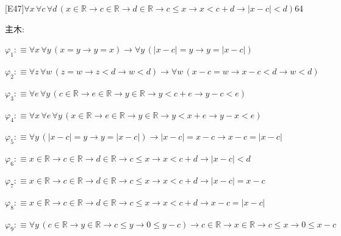 \begin{fullproof}{[E47]}{$\forall x\,\forall c\,\forall d\,(x \in \mathbb{R} \to c \in \mathbb{R} \to d \in \mathbb{R} \to c \leq x \to x < c + d \to \lvert x - c \rvert < d)$}{64}
\begin{ptree}
\end{ptree}
\noindent 主木:
\begin{ptree}
\noLine
{}
\noLine
{}
\end{ptree}
\begin{abbrevlist}
\item $\varphi_{1} :\equiv \forall x\,\forall y\,(x = y \to y = x) \to \forall y\,(\lvert x - c \rvert = y \to y = \lvert x - c \rvert)$
\item $\varphi_{2} :\equiv \forall z\,\forall w\,(z = w \to z < d \to w < d) \to \forall w\,(x - c = w \to x - c < d \to w < d)$
\item $\varphi_{3} :\equiv \forall e\,\forall y\,(c \in \mathbb{R} \to e \in \mathbb{R} \to y \in \mathbb{R} \to y < c + e \to y - c < e)$
\item $\varphi_{4} :\equiv \forall x\,\forall e\,\forall y\,(x \in \mathbb{R} \to e \in \mathbb{R} \to y \in \mathbb{R} \to y < x + e \to y - x < e)$
\item $\varphi_{5} :\equiv \forall y\,(\lvert x - c \rvert = y \to y = \lvert x - c \rvert) \to \lvert x - c \rvert = x - c \to x - c = \lvert x - c \rvert$
\item $\varphi_{6} :\equiv x \in \mathbb{R} \to c \in \mathbb{R} \to d \in \mathbb{R} \to c \leq x \to x < c + d \to \lvert x - c \rvert < d$
\item $\varphi_{7} :\equiv x \in \mathbb{R} \to c \in \mathbb{R} \to d \in \mathbb{R} \to c \leq x \to x < c + d \to \lvert x - c \rvert = x - c$
\item $\varphi_{8} :\equiv x \in \mathbb{R} \to c \in \mathbb{R} \to d \in \mathbb{R} \to c \leq x \to x < c + d \to x - c = \lvert x - c \rvert$
\item $\varphi_{9} :\equiv \forall y\,(c \in \mathbb{R} \to y \in \mathbb{R} \to c \leq y \to 0 \leq y - c) \to c \in \mathbb{R} \to x \in \mathbb{R} \to c \leq x \to 0 \leq x - c$

\end{abbrevlist}
\end{fullproof}
